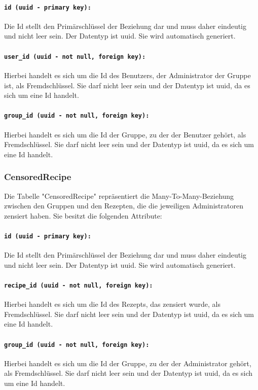 \documentclass{entwurfsheft}
\begin{document}
\paragraph{\texttt{id (uuid - primary key):}} Die Id stellt den Primärschlüssel der Beziehung dar und muss daher eindeutig und nicht leer sein. Der Datentyp ist \Gls{uuid}. Sie wird automatisch generiert.
\paragraph{\texttt{user\_id (uuid - not null, foreign key):}} Hierbei handelt es sich um die Id des Benutzers, der Administrator der Gruppe ist, als Fremdschlüssel. Sie darf nicht leer sein und der Datentyp ist \Gls{uuid}, da es sich um eine Id handelt.
\paragraph{\texttt{group\_id (uuid - not null, foreign key):}} Hierbei handelt es sich um die Id der Gruppe, zu der der Benutzer gehört, als Fremdschlüssel. Sie darf nicht leer sein und der Datentyp ist \Gls{uuid}, da es sich um eine Id handelt.
\newpage
\subsubsection{CensoredRecipe}
Die Tabelle "CensoredRecipe" repräsentiert die Many-To-Many-Beziehung zwischen den Gruppen und den Rezepten, die die jeweiligen Administratoren zensiert haben. Sie besitzt die folgenden Attribute:
\paragraph{\texttt{id (uuid - primary key):}} Die Id stellt den Primärschlüssel der Beziehung dar und muss daher eindeutig und nicht leer sein. Der Datentyp ist \Gls{uuid}. Sie wird automatisch generiert.
\paragraph{\texttt{recipe\_id (uuid - not null, foreign key):}} Hierbei handelt es sich um die Id des Rezepts, das zensiert wurde, als Fremdschlüssel. Sie darf nicht leer sein und der Datentyp ist \Gls{uuid}, da es sich um eine Id handelt.
\paragraph{\texttt{group\_id (uuid - not null, foreign key):}} Hierbei handelt es sich um die Id der Gruppe, zu der der Administrator gehört, als Fremdschlüssel. Sie darf nicht leer sein und der Datentyp ist \Gls{uuid}, da es sich um eine Id handelt.
\newpage
\end{document}
